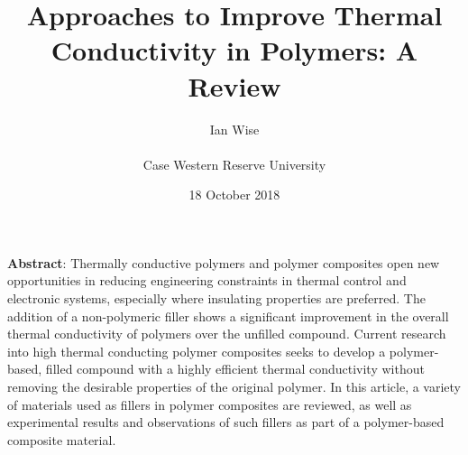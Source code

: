 \documentclass[11pt]{article}
\title{Approaches to Improve Thermal Conductivity in Polymers: A
  Review}
\author{Ian Wise \\
  \small\dmac \\
\small{Case Western Reserve University}}
\date{18 October 2018}
\begin{document}
\maketitle

\textbf{Abstract}: Thermally conductive polymers and polymer composites
open new opportunities in reducing engineering constraints in thermal
control and electronic systems, especially where insulating properties
are preferred. The addition of a non-polymeric filler shows a
significant improvement in the overall thermal conductivity of polymers
over the unfilled compound. Current research into high thermal
conducting polymer composites seeks to develop a polymer-based, filled
compound with a highly efficient thermal conductivity without removing
the desirable properties of the original polymer. In this article, a
variety of materials used as fillers in polymer composites are reviewed,
as well as experimental results and observations of such fillers as part
of a polymer-based composite material.
\end{document}
